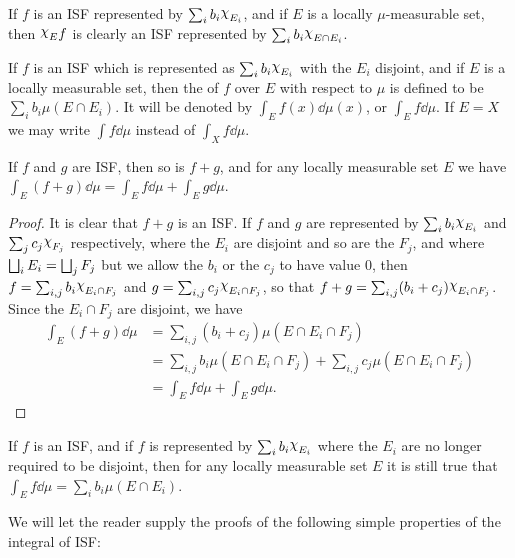 If $f$ is an ISF represented by $\sum_ib_i\idf{E_i}$, and if $E$ is a locally $\mu$-measurable set, then $\idf{E}f$ is clearly an ISF represented by $\sum_ib_i\idf{E\cap E_i}$.

\begin{definition}
If $f$ is an ISF which is represented as $\sum_i b_i\idf{E_i}$ with the $E_i$ disjoint, and if $E$ is a locally measurable set, then the  of $f$ over $E$ with respect to $\mu$ is defined to be $\sum_ib_i \mu(E \cap E_i)$. It will be denoted by $\int_Ef(x)\dd\mu(x)$, or $\int_Ef\dd\mu$. If $E=X$ we may write $\int f\dd\mu$ instead of $\int_Xf\dd\mu$.
\end{definition}

\begin{lemma}
\label{lem:linearity of ISF integral}
If $f$ and $g$ are ISF, then so is $f+g$, and for any locally measurable set $E$ we have $\int_E(f+g)\dd\mu=\int_Ef\dd\mu+\int_Eg\dd\mu$.
\end{lemma}

\begin{proof}
It is clear that $f+g$ is an ISF. If $f$ and $g$ are represented by $\sum_ib_i\idf{E_i}$ and $\sum_jc_j\idf{F_j}$ respectively, where the $E_i$ are disjoint and so are the $F_j$, and where $\bigsqcup_iE_i=\bigsqcup_jF_j$ but we allow the $b_i$ or the $c_j$ to have value 0, then $f=\sum_{i, j}b_i\idf{E_i\cap F_j}$ and $g=\sum_{i, j}c_j \idf{E_i\cap F_j}$, so that $f+g=\sum_{i, j}(b_i+c_j)\idf{E_i\cap F_j}$. Since the $E_i \cap F_j$ are disjoint, we have
\begin{align*}
    \int_E(f+g)\dd\mu&=\sum_{i,j}(b_i+c_j)\mu(E\cap E_i\cap F_j)\\
    &=\sum_{i,j}b_i\mu(E \cap E_i \cap F_j)+\sum_{i,j}c_j\mu(E\cap E_i\cap F_j)\\
    &=\int_Ef\dd\mu+\int_Eg\dd\mu.
\end{align*}
\end{proof}

\begin{corollary}
If $f$ is an ISF, and if $f$ is represented by $\sum_ib_i\idf{E_i}$ where the $E_i$ are no longer required to be disjoint, then for any locally measurable set $E$ it is still true that $\int_Ef\dd\mu=\sum_ib_i\mu(E\cap E_i)$.
\end{corollary}

We will let the reader supply the proofs of the following simple properties of the integral of ISF:


